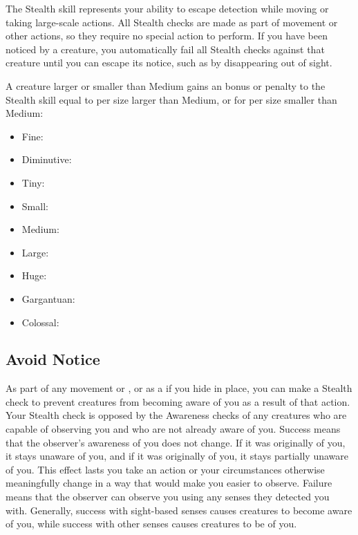 \newpage
{}
        The Stealth skill represents your ability to escape detection while moving or taking large-scale actions.
        All Stealth checks are made as part of movement or other actions, so they require no special action to perform. If you have been noticed by a creature, you automatically fail all Stealth checks against that creature until you can escape its notice, such as by disappearing out of sight.

        \label{Size and Stealth} A creature larger or smaller than Medium gains an bonus or penalty to the Stealth skill equal to  per size larger than Medium, or  for per size smaller than Medium:
            \begin{itemize}
                \item Fine: 
                \item Diminutive: 
                \item Tiny: 
                \item Small: 
                \item Medium: 
                \item Large: 
                \item Huge: 
                \item Gargantuan: 
                \item Colossal: 
            \end{itemize}

    \subsection{Avoid Notice}
        As part of any movement or , or as a  if you hide in place, you can make a Stealth check to prevent creatures from becoming aware of you as a result of that action.
        Your Stealth check is opposed by the Awareness checks of any creatures who are capable of observing you and who are not already aware of you.
        Success means that the observer's awareness of you does not change.
        If it was originally \unaware of you, it stays unaware of you, and if it was originally \partiallyunaware of you, it stays partially unaware of you.
        This effect lasts you take an action or your circumstances otherwise meaningfully change in a way that would make you easier to observe.
        Failure means that the observer can observe you using any senses they detected you with.
        Generally, success with sight-based senses causes creatures to become aware of you, while success with other senses causes creatures to be \partiallyunaware of you.

